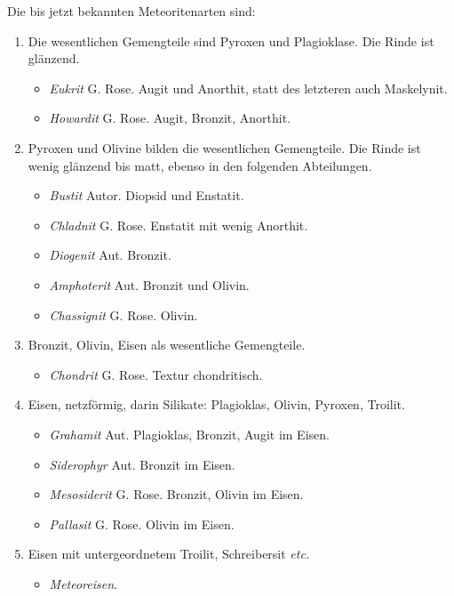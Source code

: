 \documentclass[a4paper, 11pt, oneside, polutonikogreek, german]{article}
\begin{document}
Die bis jetzt bekannten Meteoritenarten sind:
\begin{enumerate}
    \item Die wesentlichen Gemengteile sind Pyroxen und Plagioklase. Die Rinde ist glänzend.
    \begin{itemize}
        \item \emph{Eukrit} G. Rose. Augit und Anorthit, statt des letzteren auch Maskelynit.
        \item \emph{Howardit} G. Rose. Augit, Bronzit, Anorthit.
    \end{itemize}
    \item Pyroxen und Olivine bilden die wesentlichen Gemengteile. Die Rinde ist wenig glänzend bis matt, ebenso in den folgenden Abteilungen.
    \begin{itemize}
        \item \emph{Bustit} Autor. Diopsid und Enstatit.
        \item \emph{Chladnit} G. Rose. Enstatit mit wenig Anorthit.
        \item \emph{Diogenit} Aut. Bronzit.
        \item \emph{Amphoterit} Aut. Bronzit und Olivin.        
        \item \emph{Chassignit} G. Rose. Olivin.
    \end{itemize}
    \item Bronzit, Olivin, Eisen als wesentliche Gemengteile.
    \begin{itemize}
        \item \emph{Chondrit} G. Rose. Textur chondritisch.
    \end{itemize}
    \item Eisen, netzförmig, darin Silikate: Plagioklas, Olivin, Pyroxen, Troilit.
    \begin{itemize}
        \item \emph{Grahamit} Aut. Plagioklas, Bronzit, Augit im Eisen.
        \item \emph{Siderophyr} Aut. Bronzit im Eisen.
        \item \emph{Mesosiderit} G. Rose. Bronzit, Olivin im Eisen.
        \item \emph{Pallasit} G. Rose. Olivin im Eisen.
    \end{itemize}
    \item Eisen mit untergeordnetem Troilit, Schreibersit \emph{etc.}
    \begin{itemize}
        \item \emph{Meteoreisen}.
    \end{itemize}
\end{enumerate}
\end{document}
